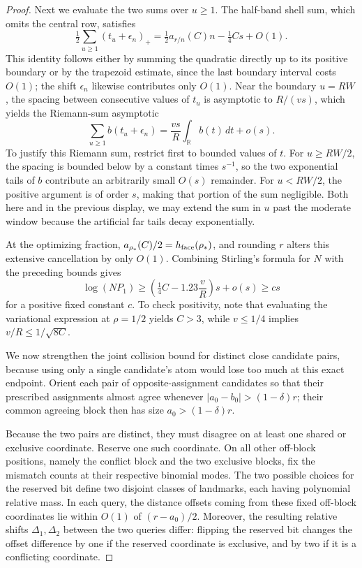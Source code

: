 \begin{proof}
Next we evaluate the two sums over \(u\ge1\). The half-band shell sum, which omits the central row, satisfies
\[
 \tfrac12\sum_{u\ge1}(t_u+\epsilon_n)_+
      =\tfrac12 a_{r/n}(C)n-\tfrac14Cs+O(1).
\]
This identity follows either by summing the quadratic directly up to its positive boundary or by the trapezoid estimate, since the last boundary interval costs \(O(1)\); the shift \(\epsilon_n\) likewise contributes only \(O(1)\). Near the boundary \(u=RW\), the spacing between consecutive values of \(t_u\) is asymptotic to \(R/(vs)\), which yields the Riemann-sum asymptotic
\[
 \sum_{u\ge1} b(t_u+\epsilon_n)
       =\frac{vs}{R}\int_{\mathbb R}b(t)\,dt+o(s).
\]
To justify this Riemann sum, restrict first to bounded values of \(t\). For \(u\ge RW/2\), the spacing is bounded below by a constant times \(s^{-1}\), so the two exponential tails of \(b\) contribute an arbitrarily small \(O(s)\) remainder. For \(u<RW/2\), the positive argument is of order \(s\), making that portion of the sum negligible. Both here and in the previous display, we may extend the sum in \(u\) past the moderate window because the artificial far tails decay exponentially.

At the optimizing fraction, \(a_{\rho_*}(C)/2=h_{\rm face}(\rho_*)\), and rounding \(r\) alters this extensive cancellation by only \(O(1)\). Combining Stirling's formula for \(N\) with the preceding bounds gives
\[
 \log(NP_1)\ge
 \left(\tfrac14 C-1.23\frac vR\right)s+o(s)\ge c s
\]
for a positive fixed constant \(c\). To check positivity, note that evaluating the variational expression at \(\rho=1/2\) yields \(C>3\), while \(v\le1/4\) implies \(v/R\le 1/\sqrt{8C}\).

We now strengthen the joint collision bound for distinct close candidate pairs, because using only a single candidate's atom would lose too much at this exact endpoint. Orient each pair of opposite-assignment candidates so that their prescribed assignments almost agree whenever \(|a_0-b_0|>(1-\delta)r\); their common agreeing block then has size \(a_0>(1-\delta)r\).

Because the two pairs are distinct, they must disagree on at least one shared or exclusive coordinate. Reserve one such coordinate. On all other off-block positions, namely the conflict block and the two exclusive blocks, fix the mismatch counts at their respective binomial modes. The two possible choices for the reserved bit define two disjoint classes of landmarks, each having polynomial relative mass. In each query, the distance offsets coming from these fixed off-block coordinates lie within \(O(1)\) of \((r-a_0)/2\). Moreover, the resulting relative shifts \(\Delta_1,\Delta_2\) between the two queries differ: flipping the reserved bit changes the offset difference by one if the reserved coordinate is exclusive, and by two if it is a conflicting coordinate.


\end{proof}
